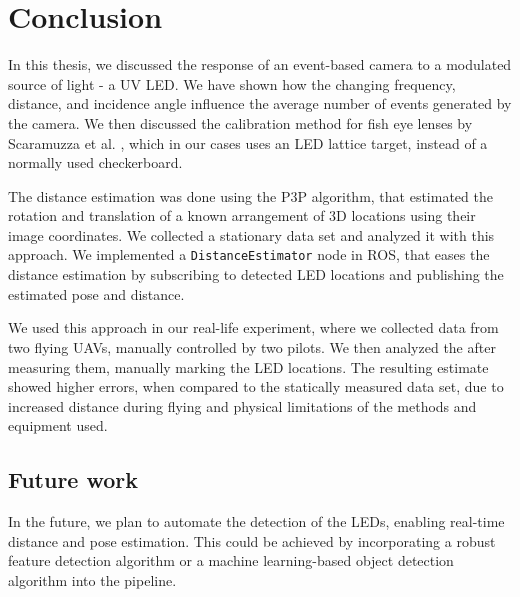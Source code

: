 
\chapter{Conclusion\label{chap:conclusion}}

In this thesis, we discussed the response of an event-based camera to a modulated source of light - a \ac{UV} \ac{LED}.
We have shown how the changing frequency, distance, and incidence angle influence the average number of events generated
by the camera. We then discussed the calibration method for fish eye lenses by Scaramuzza et al. \cite{scaramuzzacalibration},
which in our cases uses an \ac{LED} lattice target, instead of a normally used checkerboard.

The distance estimation was done using the \ac{P3P} algorithm, that estimated the rotation and translation of a known
arrangement of 3D locations using their image coordinates. We collected a stationary data set and analyzed it with this
approach. We implemented a \texttt{DistanceEstimator} node in \ac{ROS}, that eases the distance estimation by subscribing
to detected \ac{LED} locations and publishing the estimated pose and distance.

We used this approach in our real-life experiment, where we collected data from two flying \ac{UAV}s, manually controlled by two pilots. We then analyzed the after measuring them, manually marking the \ac{LED} locations. The resulting estimate showed
higher errors, when compared to the statically measured data set, due to increased distance during flying and physical
limitations of the methods and equipment used.

\section{Future work}
In the future, we plan to automate the detection of the \ac{LED}s, enabling real-time distance and pose estimation.
This could be achieved by incorporating a robust feature detection algorithm or a machine learning-based object detection
algorithm into the pipeline.
